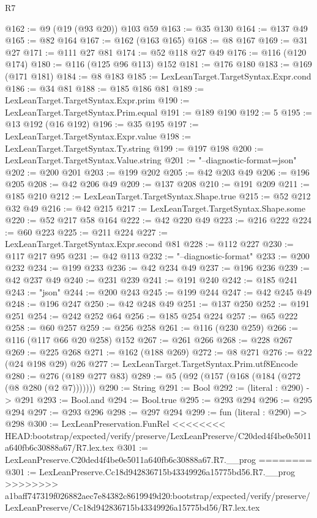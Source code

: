 \begin{lexlean}{R7}
\begin{coremodule}
{{{{{{{{{{{{{@162 := @9 (@19 (@93 @20)) @103 @59
@163 := @35 @130
@164 := @137 @49
@165 := @82 @164
@167 := @162 (@163 @165)
@168 := @8 @167
@169 := @31 @27
@171 := @111 @27 @81
@174 := @52 @118 @27 @49
@176 := @116 (@120 @174)
@180 := @116 (@125 @96 @113) @152
@181 := @176 @180
@183 := @169 (@171 @181)
@184 := @8 @183
@185 := LexLeanTarget.TargetSyntax.Expr.cond
@186 := @34 @81
@188 := @185 @186 @81
@189 := LexLeanTarget.TargetSyntax.Expr.prim
@190 := LexLeanTarget.TargetSyntax.Prim.equal
@191 := @189 @190
@192 := 5
@195 := @13 @192 (@16 @192)
@196 := @35 @195
@197 := LexLeanTarget.TargetSyntax.Expr.value
@198 := LexLeanTarget.TargetSyntax.Ty.string
@199 := @197 @198
@200 := LexLeanTarget.TargetSyntax.Value.string
@201 := "--diagnostic-format=json"
@202 := @200 @201
@203 := @199 @202
@205 := @42 @203 @49
@206 := @196 @205
@208 := @42 @206 @49
@209 := @137 @208
@210 := @191 @209
@211 := @185 @210
@212 := LexLeanTarget.TargetSyntax.Shape.true
@215 := @52 @212 @32 @49
@216 := @42 @215
@217 := LexLeanTarget.TargetSyntax.Shape.some
@220 := @52 @217 @58 @164
@222 := @42 @220 @49
@223 := @216 @222
@224 := @60 @223
@225 := @211 @224
@227 := LexLeanTarget.TargetSyntax.Expr.second @81
@228 := @112 @227
@230 := @117 @217 @95
@231 := @42 @113
@232 := "--diagnostic-format"
@233 := @200 @232
@234 := @199 @233
@236 := @42 @234 @49
@237 := @196 @236
@239 := @42 @237 @49
@240 := @231 @239
@241 := @191 @240
@242 := @185 @241
@243 := "json"
@244 := @200 @243
@245 := @199 @244
@247 := @42 @245 @49
@248 := @196 @247
@250 := @42 @248 @49
@251 := @137 @250
@252 := @191 @251
@254 := @242 @252 @64
@256 := @185 @254 @224
@257 := @65 @222
@258 := @60 @257
@259 := @256 @258
@261 := @116 (@230 @259)
@266 := @116 (@117 @66 @20 @258) @152
@267 := @261 @266
@268 := @228 @267
@269 := @225 @268
@271 := @162 (@188 @269)
@272 := @8 @271
@276 := @22 (@24 @198 @29) @26
@277 := LexLeanTarget.TargetSyntax.Prim.utf8Encode
@280 := @276 (@189 @277 @83)
@289 := @5 (@92 (@157 (@168 (@184 (@272 (@8 @280 (@2 @7)))))))
@290 := String
@291 := Bool
@292 := (literal : @290) -> @291
@293 := Bool.and
@294 := Bool.true
@295 := @293 @294
@296 := @295 @294
@297 := @293 @296
@298 := @297 @294
@299 := fun (literal : @290) => @298
@300 := LexLeanPreservation.FunRel
<<<<<<<< HEAD:bootstrap/expected/verify/preserve/LexLeanPreserve/C20ded4f4be0e5011a640fb6c30888a67/R7.lex.tex
@301 := LexLeanPreserve.C20ded4f4be0e5011a640fb6c30888a67.R7.__prog
========
@301 := LexLeanPreserve.Cc18d942836715b43349926a15775bd56.R7.__prog
>>>>>>>> a1baff747319f026882aec7e84382c8619949d20:bootstrap/expected/verify/preserve/LexLeanPreserve/Cc18d942836715b43349926a15775bd56/R7.lex.tex
}}}}}}}}}}}}}
\end{coremodule}
\end{lexlean}
